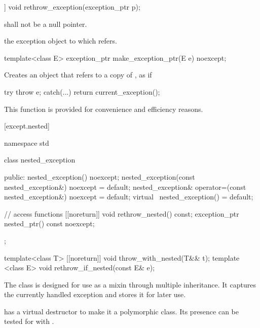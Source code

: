\begin{itemdecl}
[[noreturn]] void rethrow_exception(exception_ptr p);
\end{itemdecl}

\begin{itemdescr}
\pnum
\requires {} shall not be a null pointer.

\pnum
\throws the exception object to which  refers.
\end{itemdescr}

\begin{itemdecl}
template<class E> exception_ptr make_exception_ptr(E e) noexcept;
\end{itemdecl}

\begin{itemdescr}
\pnum
\effects Creates an  object that refers to a copy of , as if
\begin{codeblock}
try {
  throw e;
} catch(...) {
  return current_exception();
}
\end{codeblock}

\pnum
\enternote This function is provided for convenience and
efficiency reasons. \exitnote
\end{itemdescr}

[except.nested]{}

%
\begin{codeblock}
namespace std {
  class nested_exception {
  public:
    nested_exception() noexcept;
    nested_exception(const nested_exception&) noexcept = default;
    nested_exception& operator=(const nested_exception&) noexcept = default;
    virtual ~nested_exception() = default;

    // access functions
    [[noreturn]] void rethrow_nested() const;
    exception_ptr nested_ptr() const noexcept;
  };

  template<class T> [[noreturn]] void throw_with_nested(T&& t);
  template <class E> void rethrow_if_nested(const E& e);
}
\end{codeblock}

\pnum
The class  is designed for use as a mixin through
multiple inheritance. It captures the currently handled exception and stores it
for later use.

\pnum
\enternote {} has a virtual destructor to make it a
polymorphic class. Its presence can be tested for with .
\exitnote


